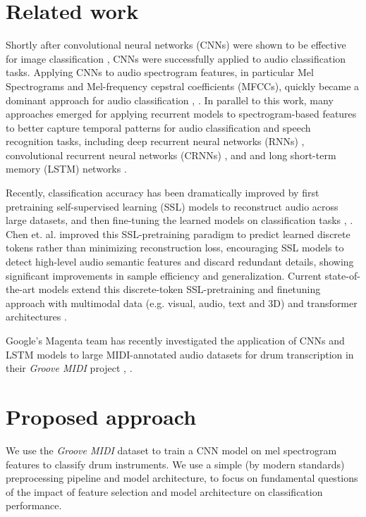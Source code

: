 \documentclass[twocolumn]{article}
\begin{document}
\section{Related work}
Shortly after convolutional neural networks (CNNs) were shown to be effective for image classification \cite{krizhevsky_imagenet_2012}, CNNs were successfully applied to audio classification tasks.
Applying CNNs to audio spectrogram features, in particular Mel Spectrograms and Mel-frequency cepstral coefficients (MFCCs), quickly became a dominant approach for audio classification \cite{piczak_environmental_2015}, \cite{hershey_cnn_2017}.
In parallel to this work, many approaches emerged for applying recurrent models to spectrogram-based features to better capture temporal patterns for audio classification and speech recognition tasks, including deep recurrent neural networks (RNNs) \cite{graves_speech_2013}, convolutional recurrent neural networks (CRNNs) \cite{choi_convolutional_2016}, and and long short-term memory (LSTM) networks \cite{stowell_detection_2015}.

Recently, classification accuracy has been dramatically improved by first pretraining self-supervised learning (SSL) models to reconstruct audio across large datasets, and then fine-tuning the learned models on classification tasks \cite{baevski_wav2vec_2020}, \cite{chen_wavlm_2022}.
Chen et. al. \cite{chen_beats_2022} improved this SSL-pretraining paradigm to predict learned discrete tokens rather than minimizing reconstruction loss, encouraging SSL models to detect high-level audio semantic features and discard redundant details, showing significant improvements in sample efficiency and generalization.
Current state-of-the-art models extend this discrete-token SSL-pretraining and finetuning approach with multimodal data (e.g. visual, audio, text and 3D) and transformer architectures \cite{srivastava_omnivec_2023}.

Google's Magenta team has recently investigated the application of CNNs and LSTM models to large MIDI-annotated audio datasets for drum transcription in their \textit{Groove MIDI} project \cite{groove2019}, \cite{groove2020}.

\section{Proposed approach}

We use the \textit{Groove MIDI} dataset \cite{groove2020} to train a CNN model on mel spectrogram features to classify drum instruments.
We use a simple (by modern standards) preprocessing pipeline and model architecture, to focus on fundamental questions of the impact of feature selection and model architecture on classification performance.
\end{document}
